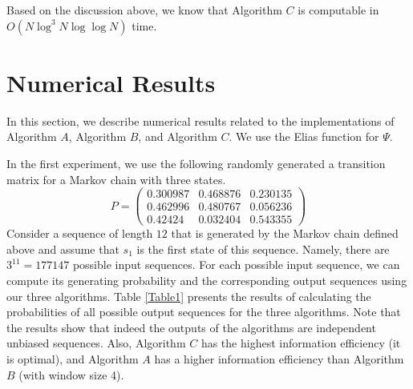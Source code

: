 \documentclass[journal]{IEEEtran}
\begin{document}
Based on the discussion above, we know that Algorithm $C$ is computable in $O(N\log^3 N\log\log N)$ time.

\section{Numerical Results}
\label{section_experiment}

In this section, we describe numerical results related to the implementations of Algorithm $A$, Algorithm $B$, and Algorithm $C$. We use the Elias function for $\Psi$.

In the first experiment, we use the following randomly generated a transition matrix for a Markov chain with three states.
$$P=\left(
  \begin{array}{ccc}
0.300987 & 0.468876  & 0.230135\\
0.462996 &  0.480767 & 0.056236\\
0.42424 &  0.032404 & 0.543355
  \end{array}
\right)$$
Consider a sequence of length $12$ that is generated by the Markov chain defined above and assume that $s_1$ is the first state of this sequence. Namely, there are $3^{11}=177147$ possible input sequences. For each possible input sequence, we can compute its generating
probability and the corresponding output sequences using our three algorithms. Table \ref{Table1} presents the results of calculating the probabilities of all possible output sequences for the three algorithms. Note that the results show that indeed the outputs of the algorithms are independent unbiased sequences. Also, Algorithm $C$ has the highest information efficiency (it is optimal), and Algorithm $A$ has a higher information efficiency than Algorithm $B$ (with window size 4).
\end{document}
